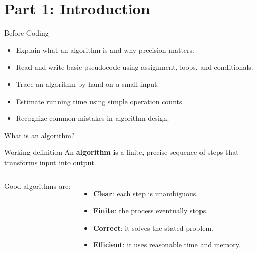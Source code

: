 \documentclass[aspectratio=43,10pt]{beamer}
\begin{document}
\section{Part 1: Introduction}

\begin{frame}{Before Coding}
  \begin{itemize}
    \item Explain what an algorithm is and why precision matters.
    \item Read and write basic pseudocode using assignment, loops, and conditionals.
    \item Trace an algorithm by hand on a small input.
    \item Estimate running time using simple operation counts.
    \item Recognize common mistakes in algorithm design.
  \end{itemize}
\end{frame}


\begin{frame}{What is an algorithm?}
  \begin{block}{Working definition}
    An \textbf{algorithm} is a finite, precise sequence of steps that transforms input into output.
  \end{block}

  \vspace{0.5em}
  \begin{columns}[T]
      Good algorithms are:
      \begin{itemize}
        \item \textbf{Clear}: each step is unambiguous.
        \item \textbf{Finite}: the process eventually stops.
        \item \textbf{Correct}: it solves the stated problem.
        \item \textbf{Efficient}: it uses reasonable time and memory.
      \end{itemize}
  \end{columns}
\end{frame}
\end{document}
